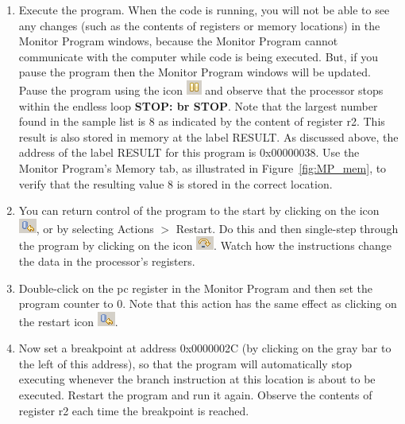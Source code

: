 \documentclass[epsfig,10pt,fullpage]{article}
\begin{document}
\begin{enumerate}
\newpage
\item Execute the program. When the code is running, you will not be able to see any changes
(such as the contents of registers or memory locations) in the Monitor Program windows,
because the Monitor Program cannot communicate with the computer while code is being
executed.  But, if you pause the program then the Monitor Program windows will be updated.
Pause the program using the icon \hbox{\includegraphics[scale=0.8]{figures/icon_pause.png}}
and observe that the processor stops within the endless loop {\bf STOP: br STOP}.
Note that the largest number found in the sample list is 8 as indicated
by the content of register r2. This result is also stored in memory at the label
RESULT.  As discussed above, the address of the label RESULT for this program is {\sf 0x00000038}.
Use the Monitor Program's Memory tab, as illustrated in Figure~\ref{fig:MP_mem},
to verify that the resulting value 8 is stored in the correct location.
\item You can return control of the program to the start by clicking 
		  on the icon \hbox{\includegraphics[scale=0.8]{figures/icon_restart.png}}, or by
		  selecting {\sf Actions} $>$ {\sf Restart}. 
Do this and then single-step through the program by clicking on the icon
\hbox{\includegraphics[scale=0.8]{figures/icon_step.png}}. Watch how the instructions change the 
data in the processor's registers. 


\item Double-click on the {\sf pc} register in the Monitor Program and then set the program
		  counter to 0. Note that this action has the same effect as
clicking on the restart icon \hbox{\includegraphics[scale=0.8]{figures/icon_restart.png}}. 
\item Now set a breakpoint at address {\sf 0x0000002C} (by clicking on the gray bar to
the left of this address), so that the program will 
automatically stop executing whenever the branch instruction at this location is about to
be executed. Restart the program and run it again.  Observe the contents of register r2 each time
the breakpoint is reached.

\end{enumerate}
\end{document}
